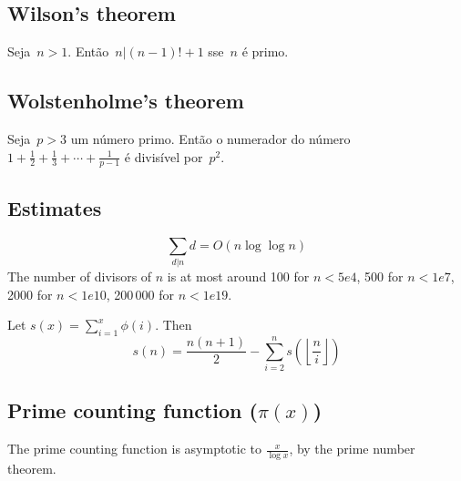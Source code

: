 \subsection{Wilson's theorem}
Seja~$n > 1$. Então~$n|(n-1)!+1$ sse~$n$ é primo. 

\subsection{Wolstenholme's theorem}
Seja~$p > 3$ um número primo. Então o numerador do número 
$ 1 + \frac{1}{2}+\frac{1}{3}+\cdots+\frac{1}{p-1} $
é divisível por~$p^2$.\newline

\subsection{Estimates}
\[
	\sum_{d|n} d = O(n \log \log n)
\]
	The number of divisors of $n$ is at most around 100 for $n < 5e4$, 500 for $n < 1e7$, 2000 for $n < 1e10$, 200\,000 for $n < 1e19$.

	Let $s(x)=\sum_{i=1}^x\phi(i).$ Then 
	\[s(n)=\frac{n(n+1)}{2}-\sum_{i=2}^ns\left(\left\lfloor\frac{n}{i}\right\rfloor\right)\]
	
\subsection{Prime counting function ($\pi(x)$)} The prime counting function is asymptotic to $\frac{x}{\log x}$, by the prime number theorem.

\iffalse
\subsection{Polya Enumeration theorem}
The enumeration theorem employs a multivariate generating function called the cycle index:
$$Z_{G}(t_{1},t_{2},\ldots ,t_{n})={\frac {1}{|G|}}\sum _{g\in G}t_{1}^{j_{1}(g)}t_{2}^{j_{2}(g)}\cdots t_{n}^{j_{n}(g)}\,,$$
where $n$ is the number of elements of $X$ and $j_k(g)$ is the number of $k$-cycles of the group element $g$ as a permutation of $X$.

The theorem states that the generating function F of the number of colored arrangements by weight is given by:
$$F(t)=Z_{G}(f(t),f(t^{2}),f(t^{3}),\ldots ,f(t^{n}))\,,$$
or in the multivariate case:
$$F(t_{1},\ldots )=Z_{G}(f(t_{1},\ldots ),f(t_{1}^{2},\ldots ),f(t_{1}^{3},\ldots ),\ldots ,f(t_{1}^{n},\ldots ))\,.$$

For instance, when seperating the graphs with the number of edges, we let $f(t)=1+t$, and examine the coefficient of $t^i$ for a graph with $i$ edges, and when seperating the necklaces with the number of beads with three different colors, we let $f(x,y,z)=x+y+z$, and examine the coefficient of $x^iy^jz^k$.
\fi
      
